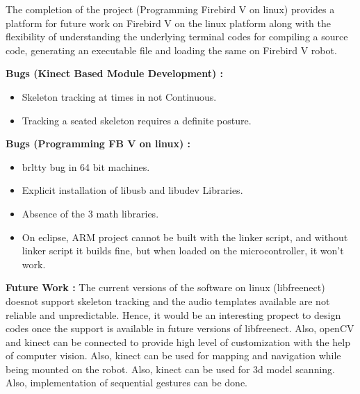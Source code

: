 \documentclass[20pt]{report}
\begin{document}
The completion of the project (Programming Firebird V on linux) provides a platform for future work on Firebird V on the linux platform along with the flexibility of understanding the underlying terminal codes for compiling a source code, generating an executable file and loading the same on Firebird V robot.
\medskip



\textbf{Bugs (Kinect Based Module Development) :}
\begin{itemize}
\item Skeleton tracking at times in not Continuous.
\item Tracking a seated skeleton requires a definite posture.
\end{itemize}

\textbf{Bugs (Programming FB V on linux) :}

\begin{itemize}
\item brltty bug in 64 bit machines.
\item Explicit installation of libusb and libudev Libraries.
\item Absence of the 3 math libraries.
\item  On eclipse, ARM project cannot be built with the linker script, and without linker script it builds fine, but when loaded on the microcontroller, it won’t work.
\end{itemize}

\medskip

\textbf{Future Work : }
The current versions of the software on linux (libfreenect) doesnot support skeleton tracking and the audio templates available are not reliable and unpredictable. Hence, it would be an interesting propect to design codes once the support is available in future versions of libfreenect. Also, openCV and kinect can be connected to provide high level of customization with the help of computer vision. Also, kinect can be used for mapping and navigation while being mounted on the robot. Also, kinect can be used for 3d model scanning. Also, implementation of sequential gestures can be done.

\medskip
\end{document}
